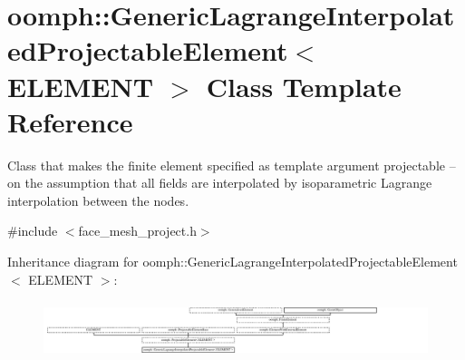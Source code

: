 \hypertarget{classoomph_1_1GenericLagrangeInterpolatedProjectableElement}{}\section{oomph\+:\+:Generic\+Lagrange\+Interpolated\+Projectable\+Element$<$ E\+L\+E\+M\+E\+NT $>$ Class Template Reference}
\label{classoomph_1_1GenericLagrangeInterpolatedProjectableElement}


Class that makes the finite element specified as template argument projectable -- on the assumption that all fields are interpolated by isoparametric Lagrange interpolation between the nodes.  




{\ttfamily \#include $<$face\+\_\+mesh\+\_\+project.\+h$>$}

Inheritance diagram for oomph\+:\+:Generic\+Lagrange\+Interpolated\+Projectable\+Element$<$ E\+L\+E\+M\+E\+NT $>$\+:\begin{figure}[H]
\begin{center}
\leavevmode
\includegraphics[height=1.674641cm]{classoomph_1_1GenericLagrangeInterpolatedProjectableElement}
\end{center}
\end{figure}

